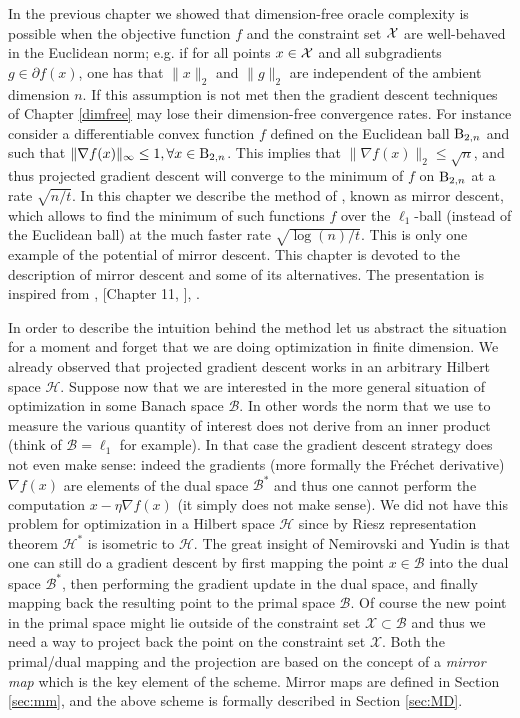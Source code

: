 In the previous chapter we showed that dimension-free oracle complexity is possible when the objective function $f$ and the constraint set $\mathcal{X}$ are well-behaved in the Euclidean norm; e.g. if for all points $x \in \mathcal{X}$ and all subgradients $g \in \partial f(x)$, one has that $\|x\|_2$ and $\|g\|_2$ are independent of the ambient dimension $n$. If this assumption is not met then the gradient descent techniques of Chapter \ref{dimfree} may lose their dimension-free convergence rates. For instance consider a differentiable convex function $f$ defined on the Euclidean ball $\mathrm{B}_{2,n}$ and such that $\|\nabla f(x)\|_{\infty} \leq 1, \forall x \in \mathrm{B}_{2,n}$. This implies that $\|\nabla f(x)\|_{2} \leq \sqrt{n}$, and thus projected gradient descent will converge to the minimum of $f$ on $\mathrm{B}_{2,n}$ at a rate $\sqrt{n / t}$. In this chapter we describe the method of \cite{NY83}, known as mirror descent, which allows to find the minimum of such functions $f$ over the $\ell_1$-ball (instead of the Euclidean ball) at the much faster rate $\sqrt{\log(n) / t}$. This is only one example of the potential of mirror descent. This chapter is devoted to the description of mirror descent and some of its alternatives. The presentation is inspired from \cite{BT03}, [Chapter 11, \cite{CL06}], \cite{Rak09, Haz11, Bub11}.
\newpage

In order to describe the intuition behind the method let us abstract the situation for a moment and forget that we are doing optimization in finite dimension. We already observed that projected gradient descent works in an arbitrary Hilbert space $\mathcal{H}$. Suppose now that we are interested in the more general situation of optimization in some Banach space $\mathcal{B}$. In other words the norm that we use to measure the various quantity of interest does not derive from an inner product (think of $\mathcal{B} = \ell_1$ for example). In that case the gradient descent strategy does not even make sense: indeed the gradients (more formally the Fr\'echet derivative) $\nabla f(x)$ are elements of the dual space $\mathcal{B}^*$ and thus one cannot perform the computation $x - \eta \nabla f(x)$ (it simply does not make sense). We did not have this problem for optimization in a Hilbert space $\mathcal{H}$ since by Riesz representation theorem $\mathcal{H}^*$ is isometric to $\mathcal{H}$. The great insight of Nemirovski and Yudin is that one can still do a gradient descent by first mapping the point $x \in \mathcal{B}$ into the dual space $\mathcal{B}^*$, then performing the gradient update in the dual space, and finally mapping back the resulting point to the primal space $\mathcal{B}$. Of course the new point in the primal space might lie outside of the constraint set $\mathcal{X} \subset \mathcal{B}$ and thus we need a way to project back the point on the constraint set $\mathcal{X}$. Both the primal/dual mapping and the projection are based on the concept of a {\em mirror map} which is the key element of the scheme. Mirror maps are defined in Section \ref{sec:mm}, and the above scheme is formally described in Section \ref{sec:MD}.

